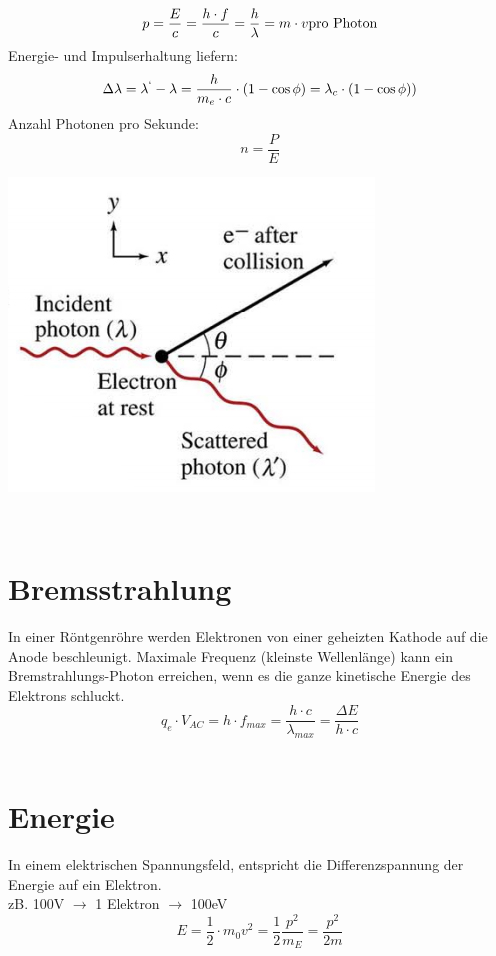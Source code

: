 \[
	p=\frac{E}{c}=\frac{h\cdot f}{c}= \frac{h}{\lambda}=m\cdot v \\ \text{pro Photon} \\ \\
\]
Energie- und Impulserhaltung liefern:
\[
	\Delta\lambda = \lambda^` -\lambda=\frac{h}{m_e\cdot c}\cdot \left( 1- \cos \phi  \right) = \lambda_c \cdot \left( 1- \cos \phi   \right) )
\]
Anzahl Photonen pro Sekunde:
\[
	n=\frac{P}{E}
\]
\begin{center}
	\includegraphics[scale = 0.3]{images/impuls_photon.jpg}
\end{center}
\
\section{Bremsstrahlung}
In einer Röntgenröhre werden Elektronen von einer geheizten  Kathode auf die Anode beschleunigt. Maximale Frequenz (kleinste Wellenlänge) kann ein Bremstrahlungs-Photon erreichen, wenn es die ganze kinetische Energie des Elektrons schluckt.\
\[
	q_e\cdot V_{AC} = h\cdot f_{max} = \frac{h\cdot c}{\lambda_{max}}=\frac{\Delta E}{h\cdot c}
\]
\\
\section{Energie}
In einem elektrischen Spannungsfeld, entspricht die Differenzspannung der Energie auf ein Elektron.\\
zB. 100V $\rightarrow$ 1 Elektron $\rightarrow$ 100eV
\[
	E= \frac{1}{2}\cdot m_0  v^2 = \frac{1}{2} \frac{p^2}{m_E}=\frac{p^2}{2m}
\]
\\
